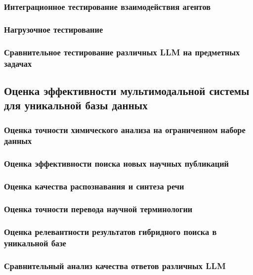 \documentclass{syksu-coursework}
\begin{document}
\subsubsection{Интеграционное тестирование взаимодействия агентов}

\subsubsection{Нагрузочное тестирование}

\subsubsection{Сравнительное тестирование различных LLM на предметных задачах}

\subsection{Оценка эффективности мультимодальной системы для уникальной базы данных}

\subsubsection{Оценка точности химического анализа на ограниченном наборе данных}

\subsubsection{Оценка эффективности поиска новых научных публикаций}

\subsubsection{Оценка качества распознавания и синтеза речи}

\subsubsection{Оценка точности перевода научной терминологии}

\subsubsection{Оценка релевантности результатов гибридного поиска в уникальной базе}

\subsubsection{Сравнительный анализ качества ответов различных LLM}
\end{document}
